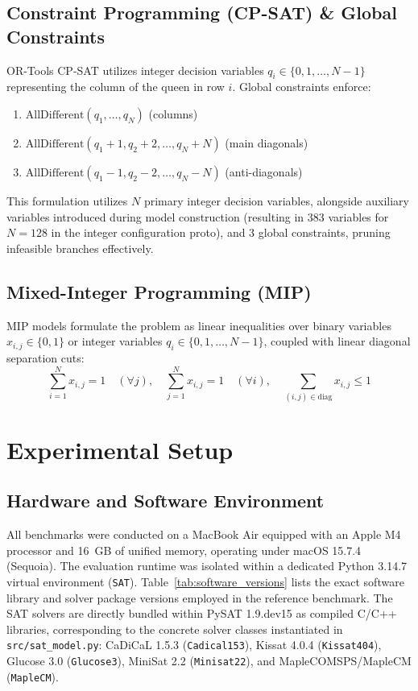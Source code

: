 \documentclass[a4paper,fleqn]{cas-sc}
\begin{document}
\subsection{Constraint Programming (CP-SAT) \& Global Constraints}
OR-Tools CP-SAT utilizes integer decision variables $q_i \in \{0, 1, \dots, N-1\}$ representing the column of the queen in row $i$. Global constraints enforce:
\begin{enumerate}
    \item $\text{AllDifferent}(q_1, \dots, q_N)$ (columns)
    \item $\text{AllDifferent}(q_1 + 1, q_2 + 2, \dots, q_N + N)$ (main diagonals)
    \item $\text{AllDifferent}(q_1 - 1, q_2 - 2, \dots, q_N - N)$ (anti-diagonals)
\end{enumerate}
This formulation utilizes $N$ primary integer decision variables, alongside auxiliary variables introduced during model construction (resulting in 383 variables for $N = 128$ in the integer configuration proto), and 3 global constraints, pruning infeasible branches effectively.

\subsection{Mixed-Integer Programming (MIP)}
MIP models formulate the problem as linear inequalities over binary variables $x_{i,j} \in \{0, 1\}$ or integer variables $q_i \in \{0, 1, \dots, N-1\}$, coupled with linear diagonal separation cuts:
$$\sum_{i=1}^N x_{i,j} = 1 \quad (\forall j), \quad \sum_{j=1}^N x_{i,j} = 1 \quad (\forall i), \quad \sum_{(i,j) \in \text{diag}} x_{i,j} \le 1$$

\section{Experimental Setup}

\subsection{Hardware and Software Environment}
All benchmarks were conducted on a MacBook Air equipped with an Apple M4 processor and 16~GB of unified memory, operating under macOS 15.7.4 (Sequoia). The evaluation runtime was isolated within a dedicated Python 3.14.7 virtual environment (\texttt{SAT}). Table~\ref{tab:software_versions} lists the exact software library and solver package versions employed in the reference benchmark. The SAT solvers are directly bundled within PySAT 1.9.dev15 as compiled C/C++ libraries, corresponding to the concrete solver classes instantiated in \texttt{src/sat\_model.py}: CaDiCaL 1.5.3 (\texttt{Cadical153}), Kissat 4.0.4 (\texttt{Kissat404}), Glucose 3.0 (\texttt{Glucose3}), MiniSat 2.2 (\texttt{Minisat22}), and MapleCOMSPS/MapleCM (\texttt{MapleCM}).
\end{document}

